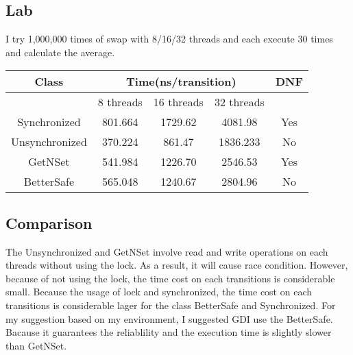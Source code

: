 \documentclass[10pt, a4paper]{IEEEtran}
\begin{document}
    \subsection{Lab}
    I try 1,000,000 times of swap with 8/16/32 threads and each execute 30 times and calculate the average.
    \begin{tabular}{|c|c|c|c|c|}
        \hline
        Class&\multicolumn{3}{c|}{Time(ns/transition)}&DNF\\
        \hline
        &8 threads&16 threads&32 threads&\\
        \hline
        Synchronized&801.664 &1729.62 &4081.98&Yes \\
        \hline
        Unsynchronized&370.224 &861.47 &1836.233&No\\
        \hline
        GetNSet&541.984 &1226.70 &2546.53&Yes\\
        \hline
        BetterSafe&565.048 &1240.67 &2804.96&No\\
        \hline
    \end{tabular}
    \subsection{Comparison}
    The Unsynchronized and GetNSet involve read and write operations on each threads without using the lock. As a result, it will cause race condition. However, because of not using the lock, the time cost on each transitions is considerable small.
    Because the usage of lock and synchronized, the time cost on each transitions is considerable lager for the class BetterSafe and Synchronized.
    For my suggestion based on my environment, I suggested GDI use the BetterSafe. Bacause it guarantees the reliablility and the execution time is slightly slower than GetNSet.


    

    

    
\end{document}
